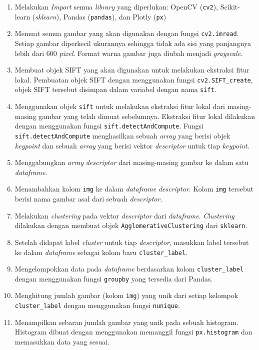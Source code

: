 \begin{enumerate}
	\item Melakukan \textit{Import} semua \textit{library} yang diperlukan: OpenCV (\texttt{cv2}), Scikit-learn (\textit{sklearn}), Pandas (\texttt{pandas}), dan Plotly (\texttt{px})
	\item Memuat semua gambar yang akan digunakan dengan fungsi \texttt{cv2.imread}. Setiap gambar diperkecil ukurannya sehingga tidak ada sisi yang panjangnya lebih dari 600 \textit{pixel}. Format warna gambar juga diubah menjadi \textit{grayscale}.
	\item Membuat objek SIFT yang akan digunakan untuk melakukan ekstraksi fitur lokal. Pembuatan objek SIFT dengan menggunakan fungsi \texttt{cv2.SIFT\_create}, objek SIFT tersebut disimpan dalam variabel dengan nama \texttt{sift}.
	\item Menggunakan objek \texttt{sift} untuk melakukan ekstraksi fitur lokal dari masing-masing gambar yang telah dimuat sebelumnya. Ekstraksi fitur lokal dilakukan dengan menggunakan fungsi \texttt{sift.detectAndCompute}. Fungsi \texttt{sift.detectAndCompute} menghasilkan sebuah \textit{array} yang berisi objek \textit{keypoint} dan sebuah \textit{array} yang berisi vektor \textit{descriptor} untuk tiap \textit{keypoint}. 
	\item Menggabungkan \textit{array} \textit{descriptor} dari masing-masing gambar ke dalam satu \textit{dataframe}.
	\item Menambahkan kolom \texttt{img} ke dalam \textit{dataframe} \textit{descriptor}. Kolom \texttt{img} tersebut berisi nama gambar asal dari sebuah \textit{descriptor}.
	\item Melakukan \textit{clustering} pada vektor \textit{descriptor} dari \textit{dataframe}. \textit{Clustering} dilakukan dengan membuat objek \texttt{AgglomerativeClustering} dari \texttt{sklearn}. 
	\item Setelah didapat label \textit{cluster} untuk tiap \textit{descriptor}, masukkan label tersebut ke dalam \textit{dataframe} sebagai kolom baru \texttt{cluster\_label}.
	\item Mengelompokkan data pada \textit{dataframe} berdasarkan kolom \texttt{cluster\_label} dengan menggunakan fungsi \texttt{groupby} yang tersedia dari Pandas.
	\item Menghitung jumlah gambar (kolom \texttt{img}) yang unik dari setiap kelompok \texttt{cluster\_label} dengan menggunakan fungsi \texttt{nunique}.
	\item Menampilkan sebaran jumlah gambar yang unik pada sebuah histogram. Histogram dibuat dengan menggunakan memanggil fungsi \texttt{px.histogram} dan memasukkan data yang sesuai.
\end{enumerate}

